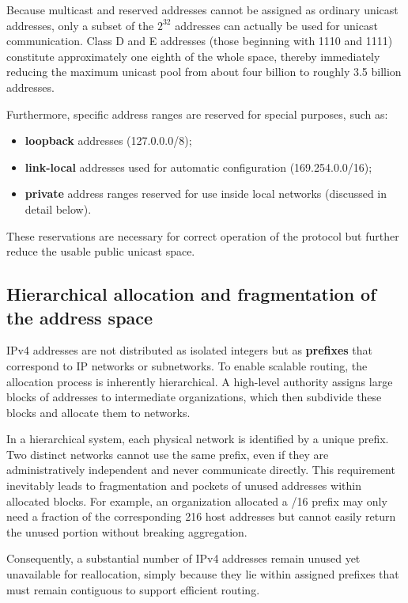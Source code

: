 \documentclass[11pt,a4paper,openany]{report}
\begin{document}
Because multicast and reserved addresses cannot be assigned as ordinary unicast addresses, only a subset of the $2^{32}$ addresses can actually be used for unicast communication. Class D and E addresses (those beginning with 1110 and 1111) constitute approximately one eighth of the whole space, thereby immediately reducing the maximum unicast pool from about four billion to roughly 3.5 billion addresses.

Furthermore, specific address ranges are reserved for special purposes, such as:

\begin{itemize}
\item \textbf{loopback} addresses (127.0.0.0/8);
\item \textbf{link-local} addresses used for automatic configuration (169.254.0.0/16);
\item \textbf{private} address ranges reserved for use inside local networks (discussed in detail below).
\end{itemize}

These reservations are necessary for correct operation of the protocol but further reduce the usable public unicast space.

\subsection{Hierarchical allocation and fragmentation of the address space}

IPv4 addresses are not distributed as isolated integers but as \textbf{prefixes} that correspond to IP networks or subnetworks. To enable scalable routing, the allocation process is inherently hierarchical. A high-level authority assigns large blocks of addresses to intermediate organizations, which then subdivide these blocks and allocate them to networks.

In a hierarchical system, each physical network is identified by a unique prefix. Two distinct networks cannot use the same prefix, even if they are administratively independent and never communicate directly. This requirement inevitably leads to fragmentation and pockets of unused addresses within allocated blocks. For example, an organization allocated a /16 prefix may only need a fraction of the corresponding 216 host addresses but cannot easily return the unused portion without breaking aggregation.

Consequently, a substantial number of IPv4 addresses remain unused yet unavailable for reallocation, simply because they lie within assigned prefixes that must remain contiguous to support efficient routing.
\end{document}
